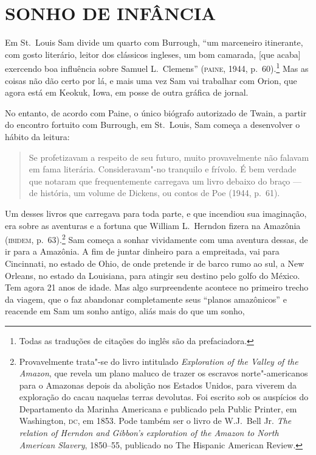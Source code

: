 \section{SONHO DE INFÂNCIA} 

Em St.~Louis Sam divide um quarto com Burrough,
``um marceneiro itinerante, com gosto literário, leitor dos clássicos ingleses,
um bom camarada, [que acaba] exercendo boa influência sobre Samuel L.~Clemens''
(\textsc{paine}, 1944, p.~60).\footnote{ Todas as traduções
de citações do inglês são da prefaciadora.} Mas as coisas não dão certo por lá, e mais uma vez Sam vai
trabalhar com Orion, que agora está em Keokuk, Iowa, em posse de outra
gráfica de jornal.

No entanto, de acordo com Paine, o único biógrafo autorizado de Twain, a
partir do encontro fortuito com Burrough, em St.~Louis, Sam começa a
desenvolver o hábito da leitura:

\begin{quote}
Se profetizavam a respeito
de seu futuro, muito provavelmente não falavam em fama literária.
Consideravam"-no tranquilo e frívolo. É bem verdade que notaram que
frequentemente carregava um livro debaixo do braço --- de história, um
volume de Dickens, ou contos de Poe (1944, p.~61).
\end{quote}

Um desses livros que carregava para toda parte, e que incendiou sua
imaginação, era sobre as aventuras e a fortuna que William L.~Herndon
fizera na Amazônia (\textsc{ibidem}, p.~63).\footnote{ Provavelmente trata"-se do
livro intitulado \textit{Exploration of the Valley of the
Amazon}, que revela um plano maluco de trazer os escravos
norte"-americanos para o Amazonas depois da abolição nos
Estados Unidos, para viverem da exploração do cacau naquelas terras
devolutas. Foi escrito sob os auspícios do Departamento da Marinha
Americana e publicado pela Public Printer, em Washington, \textsc{dc}, em 1853.
Pode também ser o livro de W.J.~Bell Jr. \textit{The relation of Herndon
and Gibbon's exploration of the Amazon to North American Slavery},
1850--55, publicado no The Hispanic American Review.} Sam começa a
sonhar vividamente com uma aventura dessas, de ir para a Amazônia. A fim de
juntar dinheiro para a empreitada, vai para Cincinnati, no estado de
Ohio, de onde pretende ir de barco rumo ao sul, a New Orleans, no estado
da Louisiana, para atingir seu destino pelo golfo do México. Tem agora
21 anos de idade. Mas algo surpreendente acontece no primeiro
trecho da viagem, que o faz abandonar completamente seus
``planos amazônicos'' e reacende em Sam um sonho
antigo, aliás mais do que um sonho,

